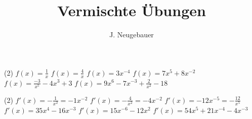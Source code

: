 \documentclass[12pt, a4paper]{scrartcl}
\author{J. Neugebauer}
\title{Vermischte Übungen}
\date{\Heute}
\begin{document}
	\ReiheTitel

	\begin{aufgabe}[subtitle=Bilden sie die Ableitung der Funktion]
		\begin{tasks}(2)
			\task $f(x) = \frac{1}{x}$
			\task $f(x) = \frac{4}{x}$
			\task $f(x) = 3x^{-4}$
			\task $f(x) = 7x^5 + 8x^{-2}$
			\task $f(x) = \frac{-3}{x^5} - 4x^3 + 3$
			\task $f(x) = 9x^6 - 7x^{-3} + \frac{2}{x^2} - 18$
		\end{tasks}

		\begin{loesung}
			\begin{tasks}(2)
				\task $f'(x) = -\frac{1}{x^2} = -1x^{-2}$
				\task $f'(x) = -\frac{4}{x^2} = -4x^{-2}$
				\task $f'(x) = -12x^{-5} = -\frac{12}{x^5}$
				\task $f'(x) = 35x^4 - 16x^{-3}$
				\task $f'(x) = 15x^{-6} - 12x^2$
				\task $f'(x) = 54x^5 + 21x^{-4} - 4x^{-3}$
			\end{tasks}
		\end{loesung}
	\end{aufgabe}

	\begin{aufgabe}[subtitle=,print=false]
	\end{aufgabe}

	\begin{aufgabe}[subtitle=,print=false]
	\end{aufgabe}

	\begin{aufgabe}[subtitle=,print=false]
	\end{aufgabe}

	\begin{aufgabe}[subtitle=,print=false]
	\end{aufgabe}
\end{document}
